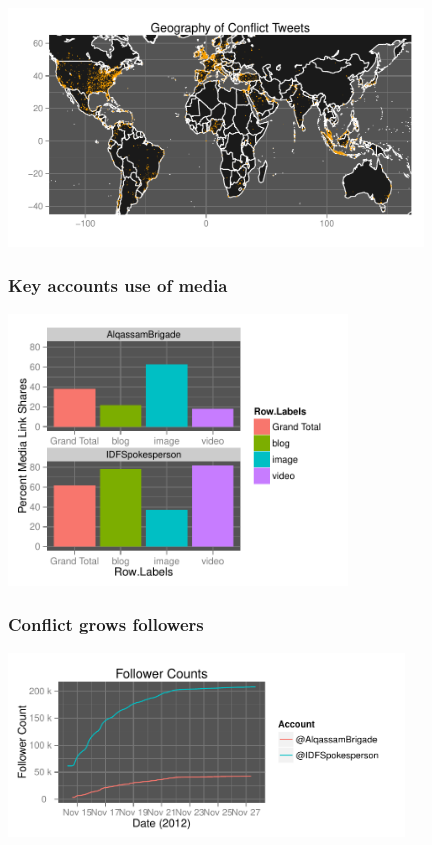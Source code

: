 \documentclass{beamer}
\begin{document}
\begin{frame}
  \begin{center}
    \includegraphics[width=11cm]{./imgs/HI_minimal-target-geo.pdf}
  \end{center}
\end{frame}

\begin{frame}\frametitle{Key accounts use of media}
  \begin{center}
    \includegraphics[width=9cm]{./imgs/HI_minimal-media.pdf}
  \end{center}
\end{frame}

\begin{frame}\frametitle{Conflict grows followers}
  \begin{center}
    \includegraphics[width=10.5cm]{./imgs/HI_minimal-followers.pdf}
  \end{center}
\end{frame}
\end{document}
